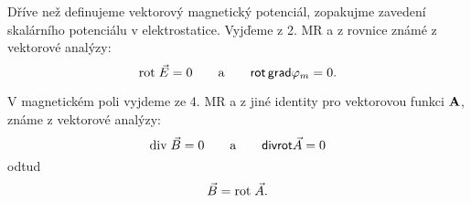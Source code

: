       Dříve než definujeme vektorový magnetický potenciál, zopakujme zavedení skalárního potenciálu
      v elektrostatice. Vyjďeme z 2. MR a z rovnice známé z vektorové analýzy: $$\mathrm{rot}\;\vec{E} = 0 \qquad
      \text{a} \qquad \textsf{rot}\,\textsf{grad}\varphi_m = 0.$$
      
      V magnetickém poli vyjdeme ze 4. MR a z jiné identity pro vektorovou funkci $\mathbf{A}$, známe z
      vektorové analýzy: $$\mathrm{div}\;\vec{B} = 0 \qquad \text{a} \qquad \textsf{div}\textsf{rot}\vec{A} =
      0$$ odtud
        \begin{equation}\label{TEMP:eq_B_rotA}
          \vec{B} = \mathrm{rot}\;\vec{A}.
        \end{equation}       
               
\printbibliography[heading=subbibliography]          